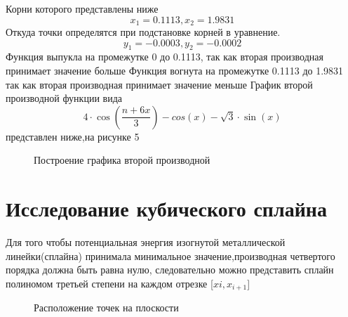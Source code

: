 \documentclass[russian,utf8,nocolumnxxxi,nocolumnxxxii]{eskdtext}
\begin{document}
Корни которого представлены ниже
\begin{equation}
x_1=0.1113,x_2=1.9831
\end{equation}
Откуда точки определятся при подстановке корней в уравнение.
\begin{equation}
y_1=-0.0003,y_2=-0.0002
\end{equation}
Функция выпукла на промежутке 0 до 0.1113, так как вторая производная принимает значение больше
Функция вогнута на промежутке 0.1113 до 1.9831  так как вторая производная принимает значение меньше
График второй производной функции вида
\begin{equation}
4\cdot\cos\left(\frac{n+6x}{3}\right)-cos(x)-\sqrt3\cdot\sin(x)
\end{equation}
представлен ниже,на рисунке 5
\begin{figure}[!ht]
    \centering
{}
\caption{Построение графика второй производной}
\label{fig:my_label}
\end{figure}
\clearpage

\newpage
\section{Исследование кубического сплайна}
Для того чтобы потенциальная энергия изогнутой металлической линейки(сплайна) принимала минимальное значение,производная четвертого порядка должна быть равна нулю, следовательно можно представить сплайн полиномом третьей степени на каждом отрезке [$xi, x_{i+1}$]

\begin{figure}[!ht]
    \centering
{}
\caption{Расположение точек на плоскости}
    \label{fig:my_label}
\end{figure}
\end{document}
